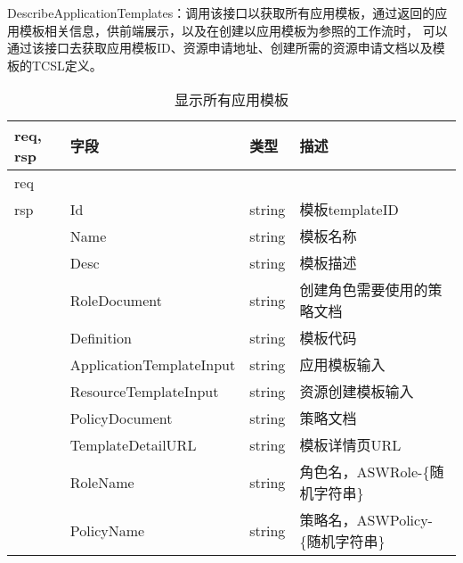 DescribeApplicationTemplates：调用该接口以获取所有应用模板，通过返回的应用模板相关信息，供前端展示，以及在创建以应用模板为参照的工作流时，
可以通过该接口去获取应用模板ID、资源申请地址、创建所需的资源申请文档以及模板的TCSL定义。
\begin{table}[H]
    \centering
    \caption{显示所有应用模板}
    \label{tab:design-interface-app-template}
    \begin{tabular}{llll}
        \toprule
        req, rsp   & 字段 & 类型 & 描述 \\
        \midrule
        req &&&\\ \hline
        rsp & Id & string & 模板templateID\\
        & Name & string & 模板名称\\
        & Desc & string & 模板描述\\
        & RoleDocument & string & 创建角色需要使用的策略文档\\
        & Definition & string & 模板代码\\
        & ApplicationTemplateInput & string & 应用模板输入\\
        & ResourceTemplateInput & string & 资源创建模板输入\\
        & PolicyDocument & string & 策略文档\\
        & TemplateDetailURL & string & 模板详情页URL\\
        & RoleName & string & 角色名，ASWRole-\{随机字符串\}\\
        & PolicyName & string & 策略名，ASWPolicy-\{随机字符串\}\\

        \bottomrule
    \end{tabular}
\end{table}



